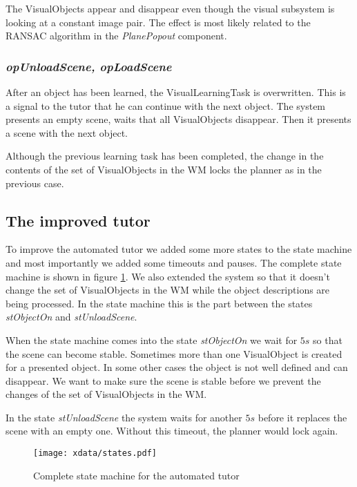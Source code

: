 \documentclass{article}
\begin{document}
The VisualObjects appear and disappear even though the visual subsystem is
looking at a constant image pair. The effect is most likely related to the
RANSAC algorithm in the {\em PlanePopout} component.

\subsubsection*{\em opUnloadScene, opLoadScene}

After an object has been learned, the VisualLearningTask is overwritten. This
is a signal to the tutor that he can continue with the next object. The system
presents an empty scene, waits that all VisualObjects disappear. Then it
presents a scene with the next object.

Although the previous learning task has been completed, the change in the
contents of the set of VisualObjects in the WM locks the planner as in the
previous case.

\subsection{The improved tutor}

To improve the automated tutor we added some more states to the state machine
and most importantly we added some timeouts and pauses. The complete state
machine is shown in figure \ref{fig:allStates}. We also extended the system so
that it doesn't change the set of VisualObjects in the WM while the object
descriptions are being processed. In the state machine this is the part between
the states {\em stObjectOn} and {\em stUnloadScene}.

When the state machine comes into the state {\em stObjectOn} we wait for $5s$
so that the scene can become stable. Sometimes more than one VisualObject is
created for a presented object. In some other cases the object is not well
defined and can disappear. We want to make sure the scene is stable before we
prevent the changes of the set of VisualObjects in the WM.

In the state {\em stUnloadScene} the system waits for another $5s$ before it
replaces the scene with an empty one. Without this timeout, the planner would
lock again.

\begin{figure}
\texttt{[image: xdata/states.pdf]}
\label{fig:allStates}
\caption{Complete state machine for the automated tutor}
\end{figure}
\end{document}
